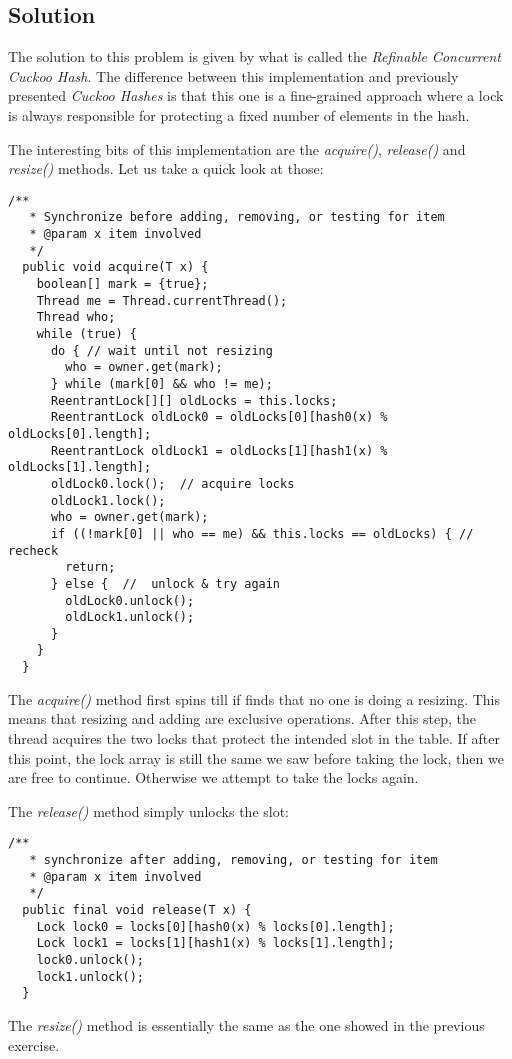 \subsection{Solution}
\par
The solution to this problem is given by what is called the \textit{Refinable
Concurrent Cuckoo Hash}. The difference between this implementation and
previously presented \textit{Cuckoo Hashes} is that this one is a fine-grained
approach where a lock is always responsible for protecting a fixed number of
elements in the hash.
\par
The interesting bits of this implementation are the \textit{acquire()},
\textit{release()} and \textit{resize()} methods. Let us take a quick look at those:
\par
\hfill
\begin{lstlisting}[style=numbers]
  /**
   * Synchronize before adding, removing, or testing for item
   * @param x item involved
   */
  public void acquire(T x) {
    boolean[] mark = {true};
    Thread me = Thread.currentThread();
    Thread who;
    while (true) {
      do { // wait until not resizing
        who = owner.get(mark);
      } while (mark[0] && who != me);
      ReentrantLock[][] oldLocks = this.locks;
      ReentrantLock oldLock0 = oldLocks[0][hash0(x) % oldLocks[0].length];
      ReentrantLock oldLock1 = oldLocks[1][hash1(x) % oldLocks[1].length];
      oldLock0.lock();  // acquire locks
      oldLock1.lock();
      who = owner.get(mark);
      if ((!mark[0] || who == me) && this.locks == oldLocks) { // recheck
        return;
      } else {  //  unlock & try again
        oldLock0.unlock();
        oldLock1.unlock();
      }
    }
  }
\end{lstlisting}
\hfill
\par
The \textit{acquire()} method first spins till if finds that no one is doing a
resizing. This means that resizing and adding are exclusive operations. After
this step, the thread acquires the two locks that protect the intended slot in
the table. If after this point, the lock array is still the same we saw before
taking the lock, then we are free to continue. Otherwise we attempt to take the
locks again.
\par
The \textit{release()} method simply unlocks the slot: 
\par
\hfill
\begin{lstlisting}[style=numbers]
  /**
   * synchronize after adding, removing, or testing for item
   * @param x item involved
   */
  public final void release(T x) {
    Lock lock0 = locks[0][hash0(x) % locks[0].length];
    Lock lock1 = locks[1][hash1(x) % locks[1].length];
    lock0.unlock();
    lock1.unlock();
  }
\end{lstlisting}
\hfill
\par
The \textit{resize()} method is essentially the same as the one showed in the
previous exercise.
\par

